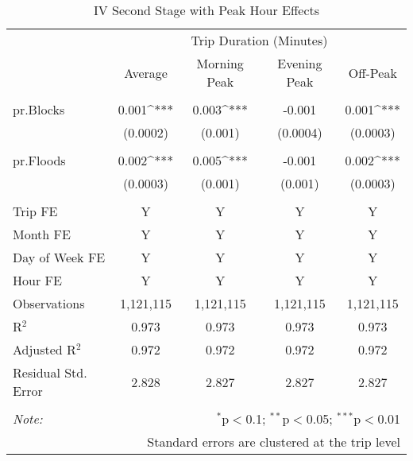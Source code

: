 \captionsetup{labelsep=newline}

\begin{table}[!htbp]
\centering

\caption{IV Second Stage with Peak Hour Effects}
\label{table:iv2-peak}

\begin{tabular}{l c c c c}
\\[-1.8ex]\hline
\hline
 & \multicolumn{4}{c}{Trip Duration (Minutes)} \\
 & \multicolumn{1}{c}{Average} & \multicolumn{1}{c}{Morning Peak} & \multicolumn{1}{c}{Evening Peak} & \multicolumn{1}{c}{Off-Peak}\\
\hline \\[-1.8ex]
pr.Blocks &  0.001^{***} & 0.003^{***} & -0.001  & 0.001^{***} \\ 
          & (0.0002) & (0.001) & (0.0004)  & (0.0003) \\
          & \\
pr.Floods & 0.002^{***} & 0.005^{***} & -0.001 & 0.002^{***} \\
          & (0.0003) & (0.001) & (0.001) & (0.0003) \\
\hline \\[-1.8ex] 
Trip FE & Y & Y & Y & Y \\ 
Month FE & Y & Y & Y & Y \\ 
Day of Week FE & Y & Y & Y & Y \\ 
Hour FE & Y & Y & Y & Y \\ 
Observations &  \multicolumn{1}{c}{1,121,115} &  \multicolumn{1}{c}{1,121,115} &  \multicolumn{1}{c}{1,121,115} &  \multicolumn{1}{c}{1,121,115}\\ 
R$^{2}$ &  \multicolumn{1}{c}{0.973} &  \multicolumn{1}{c}{0.973} &  \multicolumn{1}{c}{0.973} &  \multicolumn{1}{c}{0.973} \\ 
Adjusted R$^{2}$ & \multicolumn{1}{c}{0.972} & \multicolumn{1}{c}{0.972} & \multicolumn{1}{c}{0.972} & \multicolumn{1}{c}{0.972} \\ 
Residual Std. Error &  \multicolumn{1}{c}{2.828} & \multicolumn{1}{c}{2.827} & \multicolumn{1}{c}{2.827} & \multicolumn{1}{c}{2.827}\\ 
\hline 
\hline \\[-1.8ex] 
\textit{Note:}  & \multicolumn{4}{r}{$^{*}$p$<$0.1; $^{**}$p$<$0.05; $^{***}$p$<$0.01} \\ 
 & \multicolumn{4}{r}{Standard errors are clustered at the trip level} \\ 
\end{tabular} 
\end{table} 

